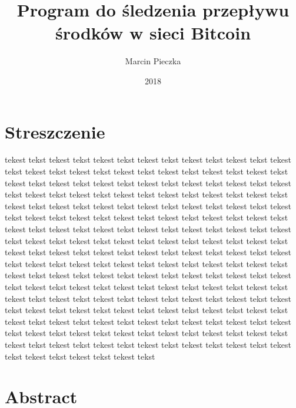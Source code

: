 \documentclass[12pt, en, eng, oneside]{mgr}
\begin{document}
\title{Program do śledzenia przepływu środków w sieci Bitcoin}
\date{2018}
\author{Marcin Pieczka}
\maketitle

\tableofcontents

\pagebreak 

\section{Streszczenie}
tekest tekst tekest tekst tekest tekst tekest tekst tekest tekst tekest tekst tekest tekst tekest tekst tekest tekst tekest tekst tekest tekst tekest tekst tekest tekst tekest tekst tekest tekst tekest tekst tekest tekst tekest tekst tekest tekst tekest tekst tekest tekst tekest tekst tekest tekst tekest tekst tekest tekst tekest tekst tekest tekst tekest tekst tekest tekst tekest tekst tekest tekst tekest tekst tekest tekst tekest tekst tekest tekst tekest tekst tekest tekst tekest tekst tekest tekst tekest tekst tekest tekst tekest tekst tekest tekst tekest tekst tekest tekst tekest tekst tekest tekst tekest tekst tekest tekst tekest tekst tekest tekst tekest tekst tekest tekst tekest tekst tekest tekst tekest tekst tekest tekst tekest tekst tekest tekst tekest tekst tekest tekst tekest tekst tekest tekst tekest tekst tekest tekst tekest tekst tekest tekst tekest tekst tekest tekst tekest tekst tekest tekst tekest tekst tekest tekst tekest tekst tekest tekst tekest tekst tekest tekst tekest tekst tekest tekst tekest tekst tekest tekst tekest tekst tekest tekst tekest tekst tekest tekst tekest tekst tekest tekst tekest tekst tekest tekst tekest tekst tekest tekst tekest tekst tekest tekst tekest tekst tekest tekst tekest tekst tekest tekst tekest tekst tekest tekst tekest tekst tekest tekst tekest tekst tekest tekst tekest tekst tekest tekst tekest tekst tekest tekst tekest tekst tekest tekst tekest tekst tekest tekst tekest tekst tekest tekst tekest tekst 

\section{Abstract}
\end{document}
